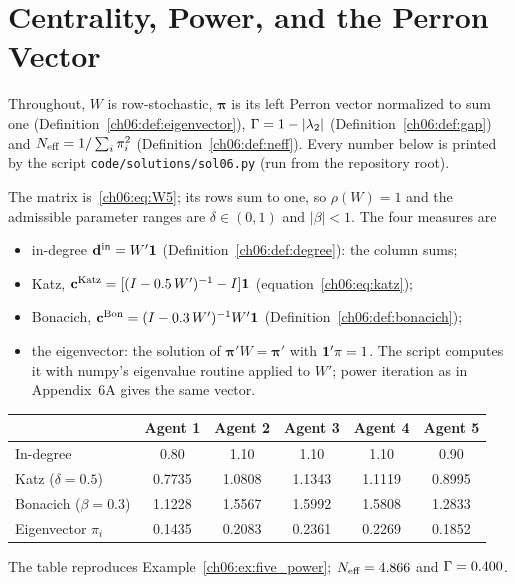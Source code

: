 \documentclass[../solutions_manual.tex]{subfiles}
\begin{document}
\ifSubfilesClassLoaded{\setcounter{chapter}{5}}{}%
\setcounter{chapter}{5}%
\chapter{Centrality, Power, and the Perron Vector}\label{sol06}

Throughout, $W$ is row-stochastic, $\boldsymbol{\pi}$ is its left Perron vector normalized to sum one (Definition~\ref{ch06:def:eigenvector}), $\Gamma = 1 - |\lambda_2|$ (Definition~\ref{ch06:def:gap}) and $N_{\text{eff}} = 1/\sum_i\pi_i^2$ (Definition~\ref{ch06:def:neff}). Every number below is printed by the script \nolinkurl{code/solutions/sol06.py} (run from the repository root).


 The matrix is~\eqref{ch06:eq:W5}; its rows sum to one, so $\rho(W) = 1$ and the admissible parameter ranges are $\delta \in (0,1)$ and $|\beta| < 1$. The four measures are
\begin{itemize}
\item in-degree $\mathbf{d}^{\text{in}} = W'\mathbf{1}$ (Definition~\ref{ch06:def:degree}): the column sums;
\item Katz, $\mathbf{c}^{\text{Katz}} = [(I - 0.5\,W')^{-1} - I]\mathbf{1}$ (equation~\eqref{ch06:eq:katz});
\item Bonacich, $\mathbf{c}^{\text{Bon}} = (I - 0.3\,W')^{-1}W'\mathbf{1}$ (Definition~\ref{ch06:def:bonacich});
\item the eigenvector: the solution of $\boldsymbol{\pi}'W = \boldsymbol{\pi}'$ with $\mathbf{1}'\pi = 1$. The script computes it with numpy's eigenvalue routine applied to $W'$; power iteration as in Appendix~6A gives the same vector.
\end{itemize}
\begin{center}
\begin{tabular}{lccccc}
\toprule
& Agent 1 & Agent 2 & Agent 3 & Agent 4 & Agent 5 \\
\midrule
In-degree & 0.80 & 1.10 & 1.10 & 1.10 & 0.90 \\
Katz ($\delta = 0.5$) & 0.7735 & 1.0808 & 1.1343 & 1.1119 & 0.8995 \\
Bonacich ($\beta = 0.3$) & 1.1228 & 1.5567 & 1.5992 & 1.5808 & 1.2833 \\
Eigenvector $\pi_i$ & 0.1435 & 0.2083 & 0.2361 & 0.2269 & 0.1852 \\
\bottomrule
\end{tabular}
\end{center}
The table reproduces Example~\ref{ch06:ex:five_power}; $N_{\text{eff}} = 4.866$ and $\Gamma = 0.400$.
\end{document}
